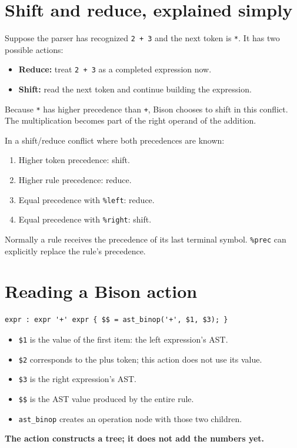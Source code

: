 \documentclass[11pt,a4paper]{report}
\begin{document}
\section{Shift and reduce, explained simply}
Suppose the parser has recognized \texttt{2 + 3} and the next token is
\texttt{*}. It has two possible actions:
\begin{itemize}
\item \textbf{Reduce:} treat \texttt{2 + 3} as a completed expression now.
\item \textbf{Shift:} read the next token and continue building the expression.
\end{itemize}
Because \texttt{*} has higher precedence than \texttt{+}, Bison chooses to
shift in this conflict. The multiplication becomes part of the right operand
of the addition.

In a shift/reduce conflict where both precedences are known:
\begin{enumerate}
\item Higher token precedence: shift.
\item Higher rule precedence: reduce.
\item Equal precedence with \texttt{\%left}: reduce.
\item Equal precedence with \texttt{\%right}: shift.
\end{enumerate}
Normally a rule receives the precedence of its last terminal symbol.
\texttt{\%prec} can explicitly replace the rule's precedence.

\section{Reading a Bison action}
\begin{lstlisting}
expr : expr '+' expr { $$ = ast_binop('+', $1, $3); }
\end{lstlisting}
\begin{itemize}
\item \texttt{\$1} is the value of the first item: the left expression's AST.
\item \texttt{\$2} corresponds to the plus token; this action does not use its value.
\item \texttt{\$3} is the right expression's AST.
\item \texttt{\$\$} is the AST value produced by the entire rule.
\item \texttt{ast\_binop} creates an operation node with those two children.
\end{itemize}
\textbf{The action constructs a tree; it does not add the numbers yet.}
\end{document}
